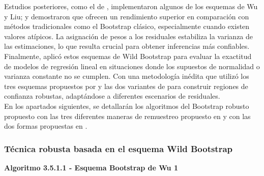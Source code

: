 Estudios posteriores, como el de \textcite{rana-2012}, implementaron algunos de los esquemas de Wu y Liu; y demostraron que ofrecen un rendimiento superior en comparación con métodos tradicionales como el Bootstrap clásico, especialmente cuando existen valores atípicos. La asignación de pesos a los residuales estabiliza la varianza de las estimaciones, lo que resulta crucial para obtener inferencias más confiables.\\


Finalmente, \textcite{zacarias-2023} aplicó estos esquemas de Wild Bootstrap para evaluar la exactitud de modelos de regresión lineal en situaciones donde los supuestos de normalidad o varianza constante no se cumplen. Con una metodología inédita que utilizó los tres esquemas propuestos por \textcite{wu-1986} y las dos variantes de \textcite{liu-1988} para construir regiones de confianza robustas, adaptándose a diferentes escenarios de residuales.\\


En los apartados siguientes, se detallarán los algoritmos del Bootstrap robusto propuesto \textcite{rana-2012} con las tres diferentes maneras de remuestreo propuesto en \textcite{wu-1986} y con las dos formas
propuestas en \textcite{liu-1988}.



\subsubsection{Técnica robusta basada en el esquema Wild Bootstrap}

\textbf{Algoritmo 3.5.1.1 - Esquema Bootstrap de Wu 1}

